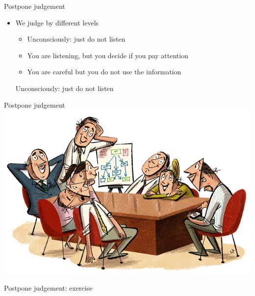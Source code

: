 \documentclass[notes]{beamer}
\begin{document}
\begin{frame}{Postpone judgement}
	\begin{itemize}
		\item We judge by different levels
		\begin{itemize}
			\item Unconsciously: just do not listen
			\item You are listening, but you decide if you pay attention
			\item You are careful but you do not use the information
		\end{itemize}
		Unconsciously: just do not listen
	\end{itemize}
\end{frame}

\begin{frame}{Postpone judgement}
	\includegraphics[width=\textwidth]{img/group.jpg}
\end{frame}

\begin{frame}{Postpone judgement: exercise}
\end{frame}
\end{document}
